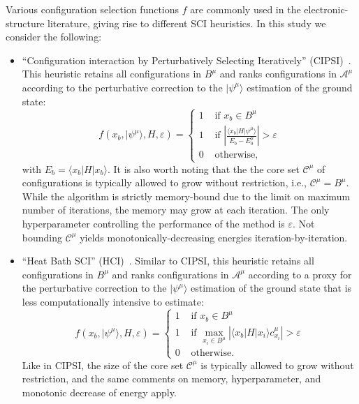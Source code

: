 \documentclass[
  reprint,            %
  amsmath,amssymb,
  aps,
  superscriptaddress, %
  longbibliography
]{revtex4-2}
\theoremstyle{definition}
\def\A{\mathcal{A}}
\def\C{\mathcal{C}}
\begin{document}
Various configuration selection functions $f$ are commonly used in the electronic-structure literature, giving rise to different SCI heuristics. In this study we consider the following:
\begin{itemize}
    \item ``Configuration interaction by Perturbatively Selecting Iteratively'' (CIPSI)~\cite{Huron_1973_CIPSI}. This heuristic retains all configurations in $B^\mu$ and ranks configurations in $\A^\mu$ according to the perturbative correction to the $|\psi^\mu\rangle$ estimation of the ground state:
    \begin{equation}
    \label{cipsi_cf}
        f(x_b, |\psi^\mu\rangle, H, \varepsilon) = 
        \begin{cases}
            1 & \textrm{ if } x_b \in B^\mu \\
            1 & \textrm{ if } \left|\frac{\langle x_b | H | \psi^\mu\rangle}{E_b - E_0^\mu} \right|> \varepsilon \\
            0 & \textrm{ otherwise},
        \end{cases}
    \end{equation}
    with $E_b = \langle x_b | H | x_b\rangle$. It is also worth noting that the the core set $\C^{\mu}$ of configurations is typically allowed to grow without restriction, i.e., $\C^\mu=B^\mu$. While the algorithm is strictly memory-bound due to the limit on maximum number of iterations, the memory may grow at each iteration. The only hyperparameter controlling the performance of the method is $\varepsilon$. Not bounding $\C^\mu$ yields monotonically-decreasing energies iteration-by-iteration. 
    
    \item ``Heat Bath SCI'' (HCI)~\cite{holmes2016heat_SCI, sharma2017semistochastic_SCI, holmes2016efficient_SCI}. Similar to CIPSI, this heuristic retains all configurations in $B^\mu$ and ranks configurations in $\A^\mu$ according to a proxy for the perturbative correction to the $|\psi^\mu\rangle$ estimation of the ground state that is less computationally intensive to estimate:
    \begin{equation}
        f(x_b, |\psi^\mu\rangle, H, \varepsilon) = 
        \begin{cases}
            1 & \textrm{ if } x_b \in B^\mu \\
            1 & \textrm{ if } \max_{x_i \in B^\mu}\left|\langle x_b| H |x_i \rangle c_{x_i}^\mu \right|> \varepsilon \\
            0 & \textrm{ otherwise}.
        \end{cases}
    \end{equation}
    Like in CIPSI, the size of the core set $\C^\mu$ is typically allowed to grow without restriction, and the same comments on memory, hyperparameter, and monotonic decrease of energy apply.
    

\end{itemize}
\end{document}
